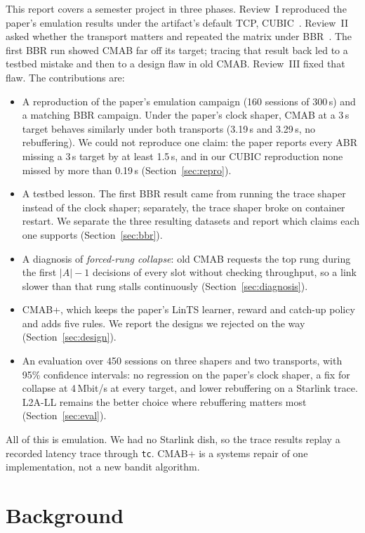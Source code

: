\documentclass[sigconf]{acmart}
\newcommand{\cmabp}{CMAB+\xspace}
\newcommand{\oldcmab}{old CMAB\xspace}
\begin{document}
This report covers a semester project in three phases. Review~I reproduced the paper's emulation results under the artifact's default TCP, CUBIC~\cite{ha2008cubic}. Review~II asked whether the transport matters and repeated the matrix under BBR~\cite{cardwell2016bbr}. The first BBR run showed CMAB far off its target; tracing that result back led to a testbed mistake and then to a design flaw in \oldcmab. Review~III fixed that flaw. The contributions are:

\begin{itemize}
\item A reproduction of the paper's emulation campaign (160 sessions of 300\,s) and a matching BBR campaign. Under the paper's clock shaper, CMAB at a 3\,s target behaves similarly under both transports (3.19\,s and 3.29\,s, no rebuffering). We could not reproduce one claim: the paper reports every ABR missing a 3\,s target by at least 1.5\,s, and in our CUBIC reproduction none missed by more than 0.19\,s (Section~\ref{sec:repro}).
\item A testbed lesson. The first BBR result came from running the trace shaper instead of the clock shaper; separately, the trace shaper broke on container restart. We separate the three resulting datasets and report which claims each one supports (Section~\ref{sec:bbr}).
\item A diagnosis of \emph{forced-rung collapse}: \oldcmab requests the top rung during the first $|A|-1$ decisions of every slot without checking throughput, so a link slower than that rung stalls continuously (Section~\ref{sec:diagnosis}).
\item \cmabp, which keeps the paper's LinTS learner, reward and catch-up policy and adds five rules. We report the designs we rejected on the way (Section~\ref{sec:design}).
\item An evaluation over 450 sessions on three shapers and two transports, with 95\% confidence intervals: no regression on the paper's clock shaper, a fix for collapse at 4\,Mbit/s at every target, and lower rebuffering on a Starlink trace. L2A-LL remains the better choice where rebuffering matters most (Section~\ref{sec:eval}).
\end{itemize}

All of this is emulation. We had no Starlink dish, so the trace results replay a recorded latency trace through \texttt{tc}. \cmabp is a systems repair of one implementation, not a new bandit algorithm.

\section{Background}
\label{sec:background}
\end{document}
